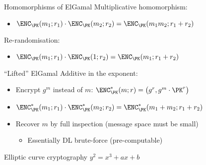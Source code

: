 \begin{frame}{Homomorphisms of ElGamal}
  \pause
  Multiplicative homomorphism:
  \begin{itemize}
    \item $\ENC_\PK(m_1; r_1) \cdot \ENC_\PK(m_2; r_2) = \ENC_\PK(m_1m_2; r_1 + r_2)$
  \end{itemize}

  \vspace*{1em}

  \pause
  Re-randomisation:
  \begin{itemize}
    \item $\ENC_\PK(m_1; r_1) \cdot \ENC_\PK(1; r_2) = \ENC_\PK(m_1; r_1 + r_2)$
  \end{itemize}
\end{frame}

\begin{frame}{\enquote{Lifted} ElGamal}
  Additive in the exponent:
  \begin{itemize}[<+(1)->]
    \item Encrypt $g^m$ instead of $m$: $\ENC^*_\PK(m; r) = \bigl(g^r, g^m \cdot \PK^r\bigr)$
    \item $\ENC^*_\PK(m_1; r_1) \cdot \ENC^*_\PK(m_2; r_2) = \ENC^*_\PK(m_1 + m_2; r_1 + r_2)$
    \item Recover $m$ by full inspection (message space must be small)
    \begin{itemize}
      \item Essentially DL brute-force (pre-computable)
    \end{itemize}
  \end{itemize}
\end{frame}

\begin{frame}{Elliptic curve cryptography}
  $y^2 = x^3 + ax + b$
  \vspace*{-2em}
  \begin{center}
  \end{center}
\end{frame}

